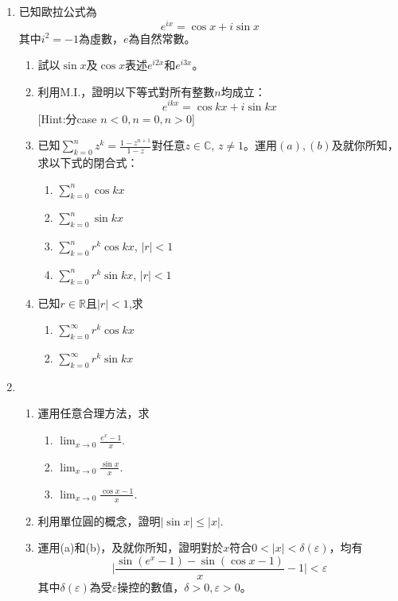 \documentclass[12pt]{article}
\begin{document}
    \begin{enumerate}
        \item 已知歐拉公式為$$e^{ix}=\cos{x}+i\sin{x}$$其中$i^2=-1$為虛數，$e$為自然常數。\begin{enumerate}
            \item 試以$\sin{x}$及$\cos{x}$表述$e^{i2x}$和$e^{i3x}$。
            \item 利用M.I.，證明以下等式對所有整數$n$均成立：$$e^{ikx}=\cos{kx}+i\sin{kx}$$[Hint:分case $n<0,n=0,n>0$]
            \item 已知$\displaystyle\sum_{k=0}^{n}z^k=\frac{1-z^{n+1}}{1-z}$對任意$z\in\mathbb{C}$, $z\neq 1$。運用$(a),(b)$及就你所知，求以下式的閉合式：\begin{enumerate}
                \item $\displaystyle\sum_{k=0}^{n}\cos{kx}$
                \item $\displaystyle\sum_{k=0}^{n}\sin{kx}$
                \item $\displaystyle\sum_{k=0}^{n}r^k\cos{kx}$, $|r|<1$
                \item $\displaystyle\sum_{k=0}^{n}r^k\sin{kx}$, $|r|<1$
            \end{enumerate}
            \item 已知$r\in\mathbb{R}$且$|r|<1$,求\begin{enumerate}
                \item $\displaystyle\sum_{k=0}^{\infty}r^k\cos{kx}$
                \item $\displaystyle\sum_{k=0}^{\infty}r^k\sin{kx}$
            \end{enumerate}
        \end{enumerate}
        \item \begin{enumerate}
            \item 運用任意合理方法，求\begin{enumerate}
                \item $\displaystyle\lim_{x\to 0}\frac{e^x-1}{x}$.
                \item $\displaystyle\lim_{x\to 0}\frac{\sin{x}}{x}$.
                \item $\displaystyle\lim_{x\to 0}\frac{\cos{x}-1}{x}$.
            \end{enumerate}
            \item 利用單位圓的概念，證明$|\sin{x}|\leq |x|$.
            \item 運用(a)和(b)，及就你所知，證明對於$x$符合$0<|x|<\delta(\varepsilon)$，均有$$\biggl|\frac{\sin(e^x-1)-\sin(\cos{x}-1)}{x}-1\biggr|<\varepsilon$$其中$\delta(\varepsilon)$為受$\varepsilon$操控的數值，$\delta>0,\varepsilon>0$。

\end{enumerate}
\end{enumerate}
\end{document}
